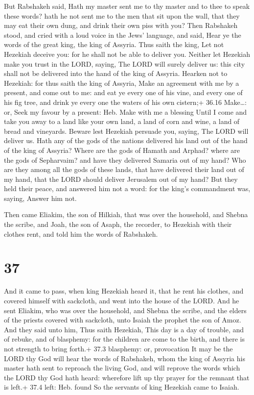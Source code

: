  But Rabshakeh said, Hath my master sent me to thy master
and to thee to speak these words? hath he not sent me to the men that
sit upon the wall, that they may eat their own dung, and drink their own
piss with you?  Then Rabshakeh stood, and cried with a loud
voice in the Jews' language, and said, Hear ye the words of the great
king, the king of Assyria.  Thus saith the king, Let not
Hezekiah deceive you: for he shall not be able to deliver you.
 Neither let Hezekiah make you trust in the LORD, saying,
The LORD will surely deliver us: this city shall not be delivered into
the hand of the king of Assyria.  Hearken not to Hezekiah:
for thus saith the king of Assyria, Make an agreement with me by a
present, and come out to me: and eat ye every one of his vine, and every
one of his fig tree, and drink ye every one the waters of his own
cistern;+ 36.16 Make\ldots: or, Seek my favour by a present: Heb. Make
with me a blessing  Until I come and take you away to a
land like your own land, a land of corn and wine, a land of bread and
vineyards.  Beware lest Hezekiah persuade you, saying, The
LORD will deliver us. Hath any of the gods of the nations delivered his
land out of the hand of the king of Assyria?  Where are the
gods of Hamath and Arphad? where are the gods of Sepharvaim? and have
they delivered Samaria out of my hand?  Who are they among
all the gods of these lands, that have delivered their land out of my
hand, that the LORD should deliver Jerusalem out of my hand?
 But they held their peace, and answered him not a word:
for the king's commandment was, saying, Answer him not.

 Then came Eliakim, the son of Hilkiah, that was over the
household, and Shebna the scribe, and Joah, the son of Asaph, the
recorder, to Hezekiah with their clothes rent, and told him the words of
Rabshakeh.

\hypertarget{section-36}{%
\section{37}\label{section-36}}

 And it came to pass, when king Hezekiah heard it, that he
rent his clothes, and covered himself with sackcloth, and went into the
house of the LORD.  And he sent Eliakim, who was over the
household, and Shebna the scribe, and the elders of the priests covered
with sackcloth, unto Isaiah the prophet the son of Amoz. 
And they said unto him, Thus saith Hezekiah, This day is a day of
trouble, and of rebuke, and of blasphemy: for the children are come to
the birth, and there is not strength to bring forth.+ 37.3 blasphemy:
or, provocation  It may be the LORD thy God will hear the
words of Rabshakeh, whom the king of Assyria his master hath sent to
reproach the living God, and will reprove the words which the LORD thy
God hath heard: wherefore lift up thy prayer for the remnant that is
left.+ 37.4 left: Heb. found  So the servants of king
Hezekiah came to Isaiah.

